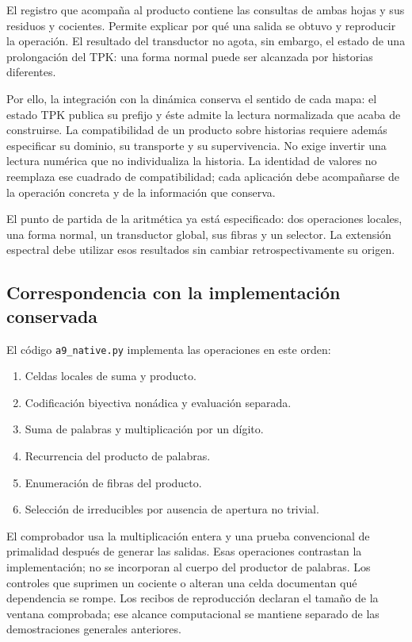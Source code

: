 El registro que acompaña al producto contiene las consultas de ambas hojas y sus residuos y cocientes. Permite explicar por qué una salida se obtuvo y reproducir la operación. El resultado del transductor no agota, sin embargo, el estado de una prolongación del TPK: una forma normal puede ser alcanzada por historias diferentes.

Por ello, la integración con la dinámica conserva el sentido de cada mapa: el estado TPK publica su prefijo y éste admite la lectura normalizada que acaba de construirse. La compatibilidad de un producto sobre historias requiere además especificar su dominio, su transporte y su supervivencia. No exige invertir una lectura numérica que no individualiza la historia. La identidad de valores no reemplaza ese cuadrado de compatibilidad; cada aplicación debe acompañarse de la operación concreta y de la información que conserva.

El punto de partida de la aritmética ya está especificado: dos operaciones locales, una forma normal, un transductor global, sus fibras y un selector. La extensión espectral debe utilizar esos resultados sin cambiar retrospectivamente su origen.

\subsection{Correspondencia con la implementación conservada}
El código \texttt{a9\_\allowbreak{}native.\allowbreak{}py} implementa las operaciones en este orden:

\begin{enumerate}
\item Celdas locales de suma y producto.
\item Codificación biyectiva nonádica y evaluación separada.
\item Suma de palabras y multiplicación por un dígito.
\item Recurrencia del producto de palabras.
\item Enumeración de fibras del producto.
\item Selección de irreducibles por ausencia de apertura no trivial.
\end{enumerate}
El comprobador usa la multiplicación entera y una prueba convencional de primalidad después de generar las salidas. Esas operaciones contrastan la implementación; no se incorporan al cuerpo del productor de palabras. Los controles que suprimen un cociente o alteran una celda documentan qué dependencia se rompe. Los recibos de reproducción declaran el tamaño de la ventana comprobada; ese alcance computacional se mantiene separado de las demostraciones generales anteriores.
